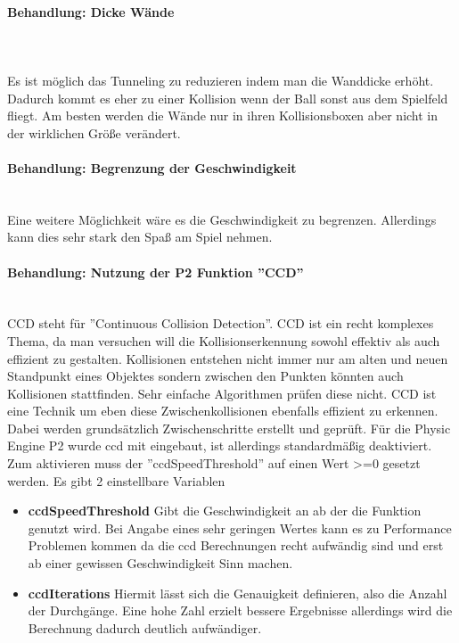 \paragraph{Behandlung: Dicke Wände}\\
\mbox{}\\
Es ist möglich das Tunneling zu reduzieren indem man die Wanddicke erhöht. Dadurch kommt es eher zu einer Kollision wenn der Ball sonst aus dem Spielfeld fliegt.
\newline
Am besten werden die Wände nur in ihren Kollisionsboxen aber nicht in der wirklichen Größe verändert.
\paragraph{Behandlung: Begrenzung der Geschwindigkeit}
\mbox{}\\
Eine weitere Möglichkeit wäre es die Geschwindigkeit zu begrenzen. Allerdings kann dies sehr stark den Spaß am Spiel nehmen.
\paragraph{Behandlung: Nutzung der P2 Funktion ''CCD'' }
\mbox{}\\
CCD steht für ''Continuous Collision Detection''. 
\newline
CCD ist ein recht komplexes Thema, da man versuchen will die Kollisionserkennung sowohl effektiv als auch effizient zu gestalten.
\newline
Kollisionen entstehen nicht immer nur am alten und neuen Standpunkt eines Objektes sondern zwischen den Punkten könnten auch Kollisionen stattfinden. Sehr einfache Algorithmen prüfen diese nicht.
\newline
CCD ist eine Technik um eben diese Zwischenkollisionen ebenfalls effizient zu erkennen. Dabei werden grundsätzlich Zwischenschritte erstellt und geprüft.
\newline
Für die Physic Engine P2 wurde ccd mit eingebaut, ist allerdings standardmäßig deaktiviert.
Zum aktivieren muss der ''ccdSpeedThreshold'' auf einen Wert >=0 gesetzt werden.
\newline
Es gibt 2 einstellbare Variablen
\begin{itemize}
\item
\textbf{ccdSpeedThreshold} Gibt die Geschwindigkeit an ab der die Funktion genutzt wird. Bei Angabe eines sehr geringen Wertes kann es zu Performance Problemen kommen da die ccd Berechnungen recht aufwändig sind und erst ab einer gewissen Geschwindigkeit Sinn machen.
\item
\textbf{ccdIterations} Hiermit lässt sich die Genauigkeit definieren, also die Anzahl der Durchgänge. Eine hohe Zahl erzielt bessere Ergebnisse allerdings wird die Berechnung dadurch deutlich aufwändiger.
\end{itemize}
\newpage
